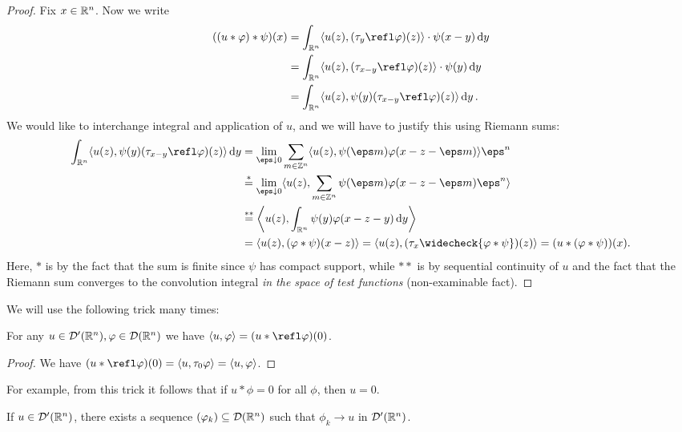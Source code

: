 \begin{proof}
	Fix $x \in \mathbb R^n$. Now we write
	\begin{align*}
		((u * \phi) * \psi)(x) &= \int_{\RR^n} \ang{u(z), (\tau_y \refl\phi)(z)} \cdot \psi(x-y) \dd{y} \\
		&= \int_{\RR^n} \ang{u(z), (\tau_{x-y}\refl\phi)(z)} \cdot \psi(y) \dd{y} \\
		&= \int_{\RR^n} \ang{u(z), \psi(y) (\tau_{x-y} \refl\phi)(z)} \dd{y}.
	\end{align*}
We would like to interchange integral and application of $u$, and we will have to justify this using Riemann sums: 
\begin{align*}
\int_{\RR^n} \ang{u(z), \psi(y) (\tau_{x-y} \refl\phi)(z)} \dd{y} &= \lim_{\eps \downarrow 0} \sum_{m \in \ZZ^n} \ang{u(z), \psi(\eps m) \phi(x - z - \eps m)} \eps^n \\
&\overset*= \lim_{\eps\downarrow0} \ang{u(z), \sum_{m \in \ZZ^n} \psi(\eps m) \phi(x - z - \eps m)\eps^n } \\
&\overset{**}= \ang*{u(z), \int_{\RR^n} \psi(y) \phi(x - z - y) \dd{y}} \\
&= \ang{u(z), (\phi * \psi)(x - z)} = \ang{u(z), (\tau_x\widecheck{\phi * \psi})(z)} = (u * (\phi * \psi))(x). 
\end{align*}
Here, $*$ is by the fact that the sum is finite since $\psi$ has compact support, while $**$ is by sequential continuity of $u$ and the fact that the Riemann sum converges to the convolution integral \emph{in the space of test functions} (non-examinable fact). 
\end{proof}

We will use the following trick many times:
\begin{proposition}
	For any $u \in \mathcal D'(\mathbb R^n), \varphi \in \mathcal D(\mathbb R^n)$ we have $\ang{u, \phi} = (u * \refl\phi)(0)$. 
\end{proposition}

\begin{proof}
	We have $(u * \refl\phi)(0) = \ang{u, \tau_0 \phi} = \ang{u, \phi}$. 
\end{proof}
For example, from this trick it follows that if $u * \phi = 0$ for all $\phi$, then $u = 0$. 

\begin{theorem}
	If $u \in \mathcal D'(\mathbb R^n)$, there exists a sequence $(\varphi_k) \subseteq \mathcal D(\mathbb R^n)$ such that $\phi_k \to u$ in $\mathcal D'(\mathbb R^n)$. 
\end{theorem}

